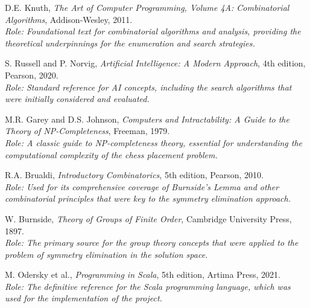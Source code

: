\documentclass[12pt,a4paper]{article}
\theoremstyle{definition}
\begin{document}
\begin{thebibliography}{99}

D.E. Knuth, \emph{The Art of Computer Programming, Volume 4A: Combinatorial Algorithms}, Addison-Wesley, 2011.
\\ \textit{Role: Foundational text for combinatorial algorithms and analysis, providing the theoretical underpinnings for the enumeration and search strategies.}

S. Russell and P. Norvig, \emph{Artificial Intelligence: A Modern Approach}, 4th edition, Pearson, 2020.
\\ \textit{Role: Standard reference for AI concepts, including the search algorithms that were initially considered and evaluated.}

M.R. Garey and D.S. Johnson, \emph{Computers and Intractability: A Guide to the Theory of NP-Completeness}, Freeman, 1979.
\\ \textit{Role: A classic guide to NP-completeness theory, essential for understanding the computational complexity of the chess placement problem.}

R.A. Brualdi, \emph{Introductory Combinatorics}, 5th edition, Pearson, 2010.
\\ \textit{Role: Used for its comprehensive coverage of Burnside's Lemma and other combinatorial principles that were key to the symmetry elimination approach.}

W. Burnside, \emph{Theory of Groups of Finite Order}, Cambridge University Press, 1897.
\\ \textit{Role: The primary source for the group theory concepts that were applied to the problem of symmetry elimination in the solution space.}

M. Odersky et al., \emph{Programming in Scala}, 5th edition, Artima Press, 2021.
\\ \textit{Role: The definitive reference for the Scala programming language, which was used for the implementation of the project.}

\end{thebibliography}
\end{document}
